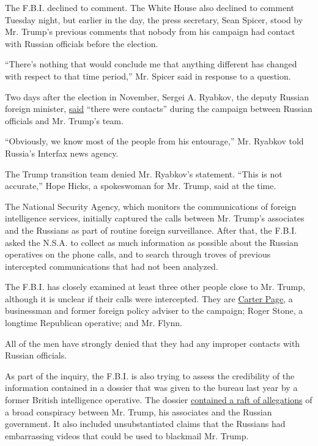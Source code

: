 The F.B.I. declined to comment. The White House also declined to comment
Tuesday night, but earlier in the day, the press secretary, Sean Spicer,
stood by Mr. Trump's previous comments that nobody from his campaign had
contact with Russian officials before the election.

``There's nothing that would conclude me that anything different has
changed with respect to that time period,'' Mr. Spicer said in response
to a question.

Two days after the election in November, Sergei A. Ryabkov, the deputy
Russian foreign minister,
\href{https://www.nytimes.com/2016/11/11/world/europe/trump-campaign-russia.html}{said}
``there were contacts'' during the campaign between Russian officials
and Mr. Trump's team.

``Obviously, we know most of the people from his entourage,'' Mr.
Ryabkov told Russia's Interfax news agency.

The Trump transition team denied Mr. Ryabkov's statement. ``This is not
accurate,'' Hope Hicks, a spokeswoman for Mr. Trump, said at the time.

The National Security Agency, which monitors the communications of
foreign intelligence services, initially captured the calls between Mr.
Trump's associates and the Russians as part of routine foreign
surveillance. After that, the F.B.I. asked the N.S.A. to collect as much
information as possible about the Russian operatives on the phone calls,
and to search through troves of previous intercepted communications that
had not been analyzed.

The F.B.I. has closely examined at least three other people close to Mr.
Trump, although it is unclear if their calls were intercepted. They are
\href{https://www.nytimes.com/2016/12/08/world/europe/carter-page-donald-trump-moscow-russia.html}{Carter
Page}, a businessman and former foreign policy adviser to the campaign;
Roger Stone, a longtime Republican operative; and Mr. Flynn.

All of the men have strongly denied that they had any improper contacts
with Russian officials.

As part of the inquiry, the F.B.I. is also trying to assess the
credibility of the information contained in a dossier that was given to
the bureau last year by a former British intelligence operative. The
dossier
\href{https://www.nytimes.com/2017/01/10/us/politics/donald-trump-russia-intelligence.html}{contained
a raft of allegations} of a broad conspiracy between Mr. Trump, his
associates and the Russian government. It also included unsubstantiated
claims that the Russians had embarrassing videos that could be used to
blackmail Mr. Trump.

